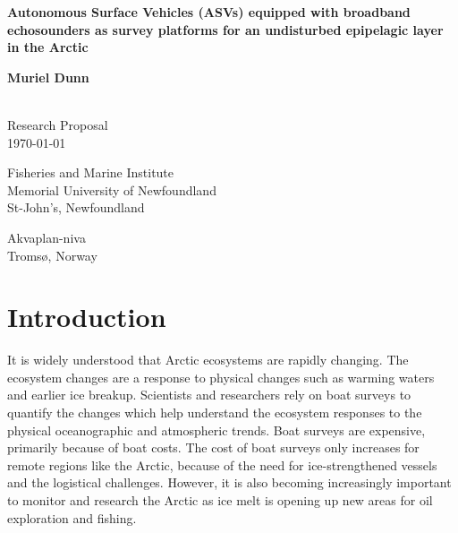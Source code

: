 \documentclass[a4paper, 12pt, Ariel]{article}
\begin{document}
\begin{titlepage}
   \begin{center}
       \vspace*{1cm}
 
       \bf{Autonomous Surface Vehicles (ASVs) equipped with broadband echosounders as survey platforms for an undisturbed epipelagic layer in the Arctic}
 
        
 
       \vspace{1cm}
 
       \textbf{Muriel Dunn}\\
       \\

 
       \vfill
 
       Research Proposal\\
	\today

 
       \vspace{2.9cm}
 
 
       Fisheries and Marine Institute\\
       Memorial University of Newfoundland\\
       St-John's, Newfoundland\\

	\vspace{0.5cm}

	Akvaplan-niva\\
	Tromsø, Norway\\

 
   \end{center}
\end{titlepage}


\tableofcontents

\newpage

\section{Introduction}
 It is widely understood that Arctic ecosystems are rapidly changing. The ecosystem changes are a response to physical changes such as warming waters and earlier ice breakup. Scientists and researchers rely on boat surveys to quantify the changes which help understand the ecosystem responses to the physical oceanographic and atmospheric trends. Boat surveys are expensive, primarily because of boat costs. The cost of boat surveys only increases for remote regions like the Arctic, because of the need for ice-strengthened vessels and the logistical challenges. However, it is also becoming increasingly important to monitor and research the Arctic as ice melt is opening up new areas for oil exploration and fishing.\\
 
\end{document}
